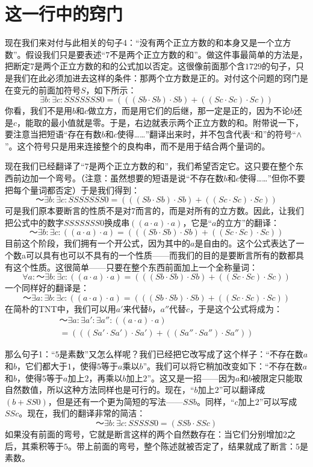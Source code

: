 \section{这一行中的窍门}

现在我们来对付与此相关的句子4：“没有两个正立方数的和本身又是一个立方数”。假设我们只是要表述“$7$不是两个正立方数的和”。做这件事最简单的方法是，把断定7是两个正立方数的和的公式加以否定。这很像前面那个含$1729$的句子，只是我们在此必须加进去这样的条件：那两个立方数是正的。对付这个问题的窍门是在变元的前面加符号$S$，如下所示：
\[
\exists b:\exists c:SSSSSSS0
  =(((Sb\cdot Sb)\cdot Sb)+((Sc\cdot Sc)\cdot Sc))
\]
你看，我们不是用$b$和$c$做立方，而是用它们的后继，那一定是正的，因为不论$b$还是$c$，能取的最小值就是零。于是，右边就表示两个正立方数的和。附带说一下，要注意当把短语“存在有数$b$和$c$使得……”翻译出来时，并不包含代表“和”的符号“$∧$”。这个符号只是用来连接整个的良构串，而不是用于结合两个量词的。

现在我们已经翻译了“$7$是两个正立方数的和”，我们希望否定它。这只要在整个东西前边加一个弯号。（注意：虽然想要的短语是说“不存在数$b$和$c$使得……”但你不要把每个量词都否定）于是我们得到：
\[
～\exists b:\exists c:SSSSSSS0
  =(((Sb\cdot Sb)\cdot Sb)+((Sc\cdot Sc)\cdot Sc))
\]
可是我们原本要断言的性质不是对$7$而言的，而是对所有的立方数。因此，让我们把公式中的数字$SSSSSSS0$换成串$((a\cdot a)\cdot a)$，它是“$a$的立方”的翻译：
\[
～\exists b:\exists c:((a\cdot a)\cdot a)
  =(((Sb\cdot Sb)\cdot Sb)+((Sc\cdot Sc)\cdot Sc))
\]
目前这个阶段，我们拥有一个开公式，因为其中的$a$是自由的。这个公式表达了一个数a可以具有也可以不具有的一个性质——而我们的目的是要断言所有的数都具有这个性质。这很简单——只要在整个东西前面加上一个全称量词：
\[
\forall a:～\exists b:\exists c:((a\cdot a)\cdot a)
  =(((Sb\cdot Sb)\cdot Sb)+((Sc\cdot Sc)\cdot Sc))
\]
一个同样好的翻译是：
\[
～\exists a:\exists b:\exists c:((a\cdot a)\cdot a)
  =(((Sb\cdot Sb)\cdot Sb)+((Sc\cdot Sc)\cdot Sc))
\]
在简朴的TNT中，我们可以用$a'$来代替$b$，$a''$代替$c$，于是这个公式将成为：
\[
\begin{multlined}
～\exists a:\exists a':\exists a'':((a\cdot a)\cdot a)\\
  =(((Sa'\cdot Sa')\cdot Sa')+((Sa''\cdot Sa'')\cdot Sa''))
\end{multlined}
\]

那么句子1：“$5$是素数”又怎么样呢？我们已经把它改写成了这个样子：“不存在数$a$和$b$，它们都大于$1$，使得$5$等于$a$乘以$b$”。我们可以将它稍加改变如下：“不存在数$a$和$b$，使得$5$等于$a$加上$2$，再乘以$b$加上$2$”。这又是一招——因为$a$和$b$被限定只能取自然数值，所以这种方法同样也是可行的。现在，“$b$加上$2$”可以翻译成$(b+SS0)$，但是还有一个更为简短的写法——$SSb$。同样，“$c$加上$2$”可以写成$SSc$。现在，我们的翻译非常的简洁：
\[
～\exists b:\exists c:SSSSS0=(SSb\cdot SSc)
\]
如果没有前面的弯号，它就是断言这样的两个自然数存在：当它们分别增加$2$之后，其乘积等于$5$。带上前面的弯号，整个陈述就被否定了，结果就成了断言：$5$是素数。

